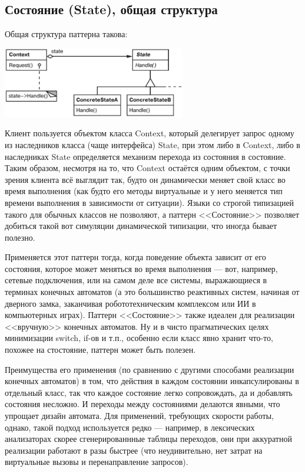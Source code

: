 \documentclass{../text-style}
\begin{document}
\subsection{Состояние (State), общая структура}

Общая структура паттерна такова:

\begin{center}
    \includegraphics[width=0.6\textwidth]{state.png}
\end{center}

Клиент пользуется объектом класса Context, который делегирует запрос одному из наследников класса (чаще интерфейса) State, при этом либо в Context, либо в наследниках State определяется механизм перехода из состояния в состояние. Таким образом, несмотря на то, что Context остаётся одним объектом, с точки зрения клиента всё выглядит так, будто он динамически меняет свой класс во время выполнения (как будто его методы виртуальные и у него меняется тип времени выполнения в зависимости от ситуации). Языки со строгой типизацией такого для обычных классов не позволяют, а паттерн <<Состояние>> позволяет добиться такой вот симуляции динамической типизации, что иногда бывает полезно.

Применяется этот паттерн тогда, когда поведение объекта зависит от его состояния, которое может меняться во время выполнения --- вот, например, сетевые подключения, или на самом деле все системы, выражающиеся в терминах конечных автоматов (а это большинство реактивных систем, начиная от дверного замка, заканчивая робототехническим комплексом или ИИ в компьютерных играх). Паттерн <<Состояние>> также идеален для реализации <<вручную>> конечных автоматов. Ну и в чисто прагматических целях минимизации switch, if-ов и т.п., особенно если класс явно хранит что-то, похожее на стостояние, паттерн может быть полезен.

Преимущества его применения (по сравнению с другими способами реализации конечных автоматов) в том, что действия в каждом состоянии инкапсулированы в отдельный класс, так что каждое состояние легко сопровождать, да и добавлять состояния несложно. И переходы между состояниями делаются явными, что упрощает дизайн автомата. Для применений, требующих скорости работы, однако, такой подход используется редко --- например, в лексических анализаторах скорее сгенерированнные таблицы переходов, они при аккуратной реализации работают в разы быстрее (что неудивительно, нет затрат на виртуальные вызовы и перенаправление запросов).
\end{document}
